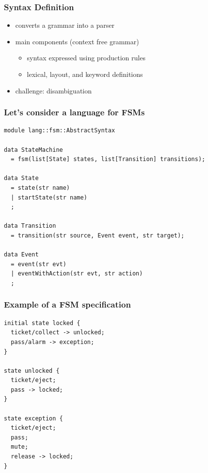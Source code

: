 \documentclass{beamer}
\begin{document}
\begin{frame}
  \frametitle{Syntax Definition}

  \begin{itemize}
  \item converts a grammar into a parser
  \item main components (context free grammar) 
    \begin{itemize}
    \item syntax expressed using production rules
    \item lexical, layout, and keyword definitions
    \end{itemize} \pause
  \item challenge: disambiguation
  \end{itemize}

\end{frame}

\begin{frame}[fragile]
\frametitle{Let's consider a language for FSMs} 

\begin{lstlisting}[language=Rascal]
module lang::fsm::AbstractSyntax

data StateMachine 
  = fsm(list[State] states, list[Transition] transitions);

data State 
  = state(str name)
  | startState(str name)
  ;
           
data Transition 
  = transition(str source, Event event, str target);
  
data Event 
  = event(str evt)
  | eventWithAction(str evt, str action)
  ;
\end{lstlisting}
\end{frame}

\begin{frame}[fragile]
 \frametitle{Example of a FSM specification}

 \begin{lstlisting}[language=FSM]
initial state locked {
  ticket/collect -> unlocked;
  pass/alarm -> exception;
}

state unlocked {
  ticket/eject;
  pass -> locked;
}

state exception {
  ticket/eject;
  pass;
  mute;
  release -> locked;
}
 \end{lstlisting}
\end{frame}
\end{document}
